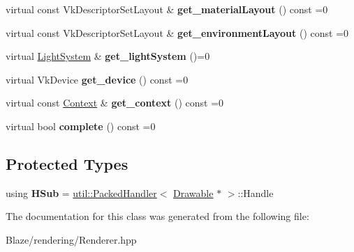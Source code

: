 \begin{DoxyCompactItemize}
\item 
\mbox{\label{classblaze_1_1Renderer_a99c966d3ba27170c87c73b475734b727}} 
virtual const Vk\+Descriptor\+Set\+Layout \& {\bfseries get\+\_\+material\+Layout} () const =0
\item 
\mbox{\label{classblaze_1_1Renderer_aff4200083b396c6ed290251628736169}} 
virtual const Vk\+Descriptor\+Set\+Layout \& {\bfseries get\+\_\+environment\+Layout} () const =0
\item 
\mbox{\label{classblaze_1_1Renderer_a71ff380bf7a0ccf44d2d28f902b6aa6a}} 
virtual \hyperlink{classblaze_1_1LightSystem}{Light\+System} \& {\bfseries get\+\_\+light\+System} ()=0
\item 
\mbox{\label{classblaze_1_1Renderer_a2eb5167130e30ecbf59dd1b82f7104ec}} 
virtual Vk\+Device {\bfseries get\+\_\+device} () const =0
\item 
\mbox{\label{classblaze_1_1Renderer_ab72fd83ae03f68e72afde48ce241ae5a}} 
virtual const \hyperlink{classblaze_1_1Context}{Context} \& {\bfseries get\+\_\+context} () const =0
\item 
\mbox{\label{classblaze_1_1Renderer_af6d6571efbdf5f4a0bbc4e619f59ccb4}} 
virtual bool {\bfseries complete} () const =0
\end{DoxyCompactItemize}
\subsection*{Protected Types}
\begin{DoxyCompactItemize}
\item 
\mbox{\label{classblaze_1_1Renderer_a168cdb0440569f01ce7bf630cb210277}} 
using {\bfseries H\+Sub} = \hyperlink{classblaze_1_1util_1_1PackedHandler}{util\+::\+Packed\+Handler}$<$ \hyperlink{classblaze_1_1Drawable}{Drawable} $\ast$ $>$\+::Handle
\end{DoxyCompactItemize}


The documentation for this class was generated from the following file\+:\begin{DoxyCompactItemize}
\item 
Blaze/rendering/Renderer.\+hpp\end{DoxyCompactItemize}
